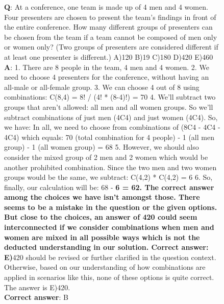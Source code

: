 \begin{figure}[H]
\centering
\begin{tcolorbox}[colback=blue!5!white,colframe=blue!75!black,title=AQUA-RAT example (\phiinstruct)]
\textbf{Q}: At a conference, one team is made up of 4 men and 4 women. Four presenters are chosen to present the team's findings in front of the entire conference. How many different groups of presenters can be chosen from the team if a team cannot be composed of men only or women only? (Two groups of presenters are considered different if at least one presenter is different.) A)120 B)19 C)180 D)420 E)460
\\

\textbf{A}: 1. There are 8 people in the team, 4 men and 4 women. 2. We need to choose 4 presenters for the conference, without having an all-male or all-female group. 3. We can choose 4 out of 8 using combinations: C(8,4) = 8! / (4! * (8-4)!) = 70 4. We'll subtract two groups that aren't allowed: all men and all women groups. So we'll subtract combinations of just men (4C4) and just women (4C4). So, we have: In all, we need to choose from combinations of (8C4 - 4C4 - 4C4) which equals: 70 (total combination for 4 people) - 1 (all men group) - 1 (all women group) = 68 5. However, we should also consider the mixed group of 2 men and 2 women which would be another prohibited combination. Since the two men and two women groups would be the same, we subtract: C(4,2) * C(4,2) = 6 6. So, finally, our calculation will be: 68 - \textbf{6 = 62. The correct answer among the choices we have isn't amongst those. There seems to be a mistake in the question or the given options. But close to the choices, an answer of 420 could seem interconnected if we consider combinations when men and women are mixed in all possible ways which is not the deducted understanding in our solution. Correct answer: E)}420 should be revised or further clarified in the question context. Otherwise, based on our understanding of how combinations are applied in scenarios like this, none of these options is quite correct. The answer is E)420.\\

\textbf{Correct answer}: B
\end{tcolorbox}
\end{figure}

